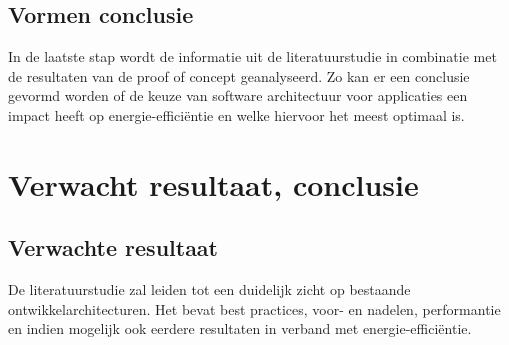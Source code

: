 \subsection{Vormen conclusie}
In de laatste stap wordt de informatie uit de literatuurstudie in combinatie met de resultaten van de proof of concept geanalyseerd. Zo kan er een conclusie gevormd worden of de keuze van software architectuur voor applicaties een impact heeft op energie-efficiëntie en welke hiervoor het meest optimaal is.

%
%
%
%
%


\section{Verwacht resultaat, conclusie}%
\label{sec:verwachte_resultaten}
\subsection{Verwachte resultaat}
De literatuurstudie zal leiden tot een duidelijk zicht op bestaande ontwikkelarchitecturen. Het bevat best practices, voor- en nadelen, performantie en indien mogelijk ook eerdere resultaten in verband met energie-efficiëntie.


